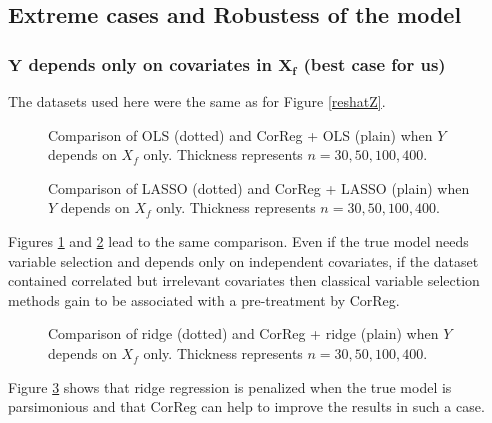 \documentclass[11pt,a4paper]{article}
\begin{document}
\subsection{Extreme cases and Robustess of the model} \label{resrobust}
\subsubsection{$\boldsymbol{Y}$ depends only on covariates in $\boldsymbol{X_f}$ (best case for us)}	 \label{tableMSEsimdroit}
The datasets used here were the same as for Figure \ref{reshatZ}.

 \begin{figure}[h!]
	 \quad
	\caption{Comparison of OLS (dotted) and CorReg + OLS (plain) when $Y$ depends on $X_f$ only. Thickness represents $n=30,50,100,400$.}\label{X1OLS}
\end{figure}

\begin{figure}[h!]
	 \quad
	\caption{Comparison of LASSO (dotted) and CorReg + LASSO (plain) when $Y$ depends on $X_f$ only. Thickness represents $n=30,50,100,400$.}\label{X1lasso}
\end{figure}
Figures \ref{X1OLS} and \ref{X1lasso} lead to the same comparison. Even if the true model needs variable selection and depends only on independent covariates, if the dataset contained correlated but irrelevant covariates then classical variable selection methods gain to be associated with a pre-treatment by CorReg.

\begin{figure}[h!]
	 \quad
	\caption{Comparison of ridge (dotted) and CorReg + ridge (plain) when $Y$ depends on $X_f$ only. Thickness represents $n=30,50,100,400$.}\label{X1ridge}
\end{figure}
Figure \ref{X1ridge} shows that ridge regression is penalized when the true model is parsimonious and that CorReg can help to improve the results in such a case.
\end{document}
